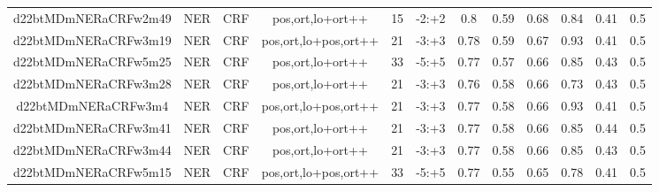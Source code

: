 \documentclass[a4paper]{article}
\begin{document}
\begin{landscape}
\begin{center}
\begin{tabular}{ |c|c|c|c|c|c|c|c|c|c|c|c|}
 	
 
 	
 		
 		\small{ d22btMDmNERaCRFw2m49 } & NER & CRF & pos,ort,lo+ort++  &  15 &  -2:+2  &  0.8 & 0.59 & 0.68  &  0.84 & 0.41 & 0.5 \\
 		

 	
 
 	
 		
 		\small{ d22btMDmNERaCRFw3m19 } & NER & CRF & pos,ort,lo+pos,ort++  &  21 &  -3:+3  &  0.78 & 0.59 & 0.67  &  0.93 & 0.41 & 0.5 \\
 		

 	
 
 	
 		
 		\small{ d22btMDmNERaCRFw5m25 } & NER & CRF & pos,ort,lo+ort++  &  33 &  -5:+5  &  0.77 & 0.57 & 0.66  &  0.85 & 0.43 & 0.5 \\
 		

 	
 
 	
 		
 		\small{ d22btMDmNERaCRFw3m28 } & NER & CRF & pos,ort,lo+ort++  &  21 &  -3:+3  &  0.76 & 0.58 & 0.66  &  0.73 & 0.43 & 0.5 \\
 		

 	
 
 	
 		
 		\small{ d22btMDmNERaCRFw3m4 } & NER & CRF & pos,ort,lo+pos,ort++  &  21 &  -3:+3  &  0.77 & 0.58 & 0.66  &  0.93 & 0.41 & 0.5 \\
 		

 	
 
 	
 		
 		\small{ d22btMDmNERaCRFw3m41 } & NER & CRF & pos,ort,lo+ort++  &  21 &  -3:+3  &  0.77 & 0.58 & 0.66  &  0.85 & 0.44 & 0.5 \\
 		

 	
 
 	
 		
 		\small{ d22btMDmNERaCRFw3m44 } & NER & CRF & pos,ort,lo+ort++  &  21 &  -3:+3  &  0.77 & 0.58 & 0.66  &  0.85 & 0.43 & 0.5 \\
 		

 	
 
 	
 		
 		\small{ d22btMDmNERaCRFw5m15 } & NER & CRF & pos,ort,lo+pos,ort++  &  33 &  -5:+5  &  0.77 & 0.55 & 0.65  &  0.78 & 0.41 & 0.5 \\
 		
 \hline
\end{tabular}
\end{center}





\end{landscape}
\end{document}
